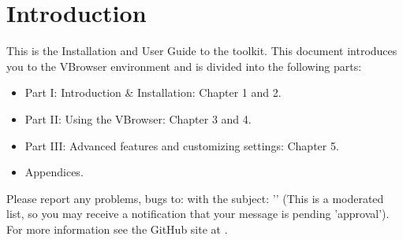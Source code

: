\chapter{Introduction}
\label{sec:Introduction}


This is the Installation and User Guide to the \vbrowser toolkit. 
This document introduces you to the VBrowser 
environment and is divided into the following parts: 

\begin{itemize} 
  \item 
    Part I: Introduction \& Installation: Chapter 1 and 2.
  \item 
    Part II: Using the VBrowser: Chapter 3 and 4. 
  \item
    Part III: Advanced features and customizing settings: Chapter 5.  
  \item
    Appendices.  
\end{itemize} 

Please report any problems, bugs to:  with the subject: 
'' (This is a moderated list, so you may receive a
notification that your message is pending 'approval'). \\
For more information see the GitHub site at . 

